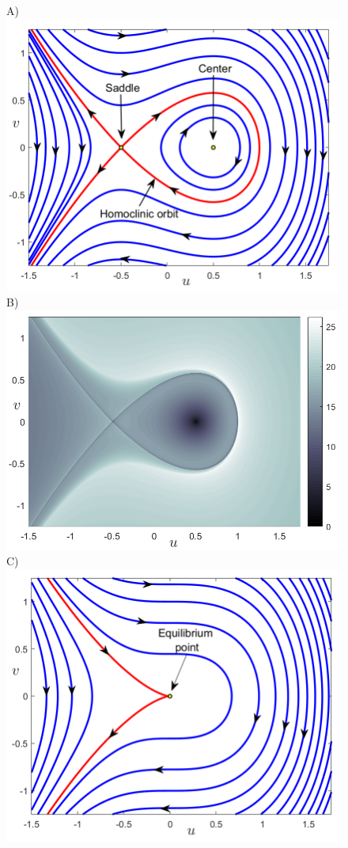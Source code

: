 \documentclass[8pt]{article}
\begin{document}
\begin{figure}[htbp]
	\begin{center}
		A)\includegraphics[scale=0.26]{fig2a.png}
		B)\includegraphics[scale=0.3]{fig2b.png}
		C)\includegraphics[scale=0.26]{fig2c.png}

\end{center}
\end{figure}
\end{document}
